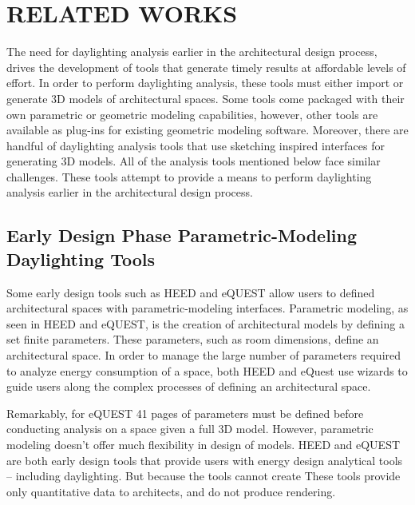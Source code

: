 \chapter{RELATED WORKS} \label{sec:introduction}
The need for daylighting analysis earlier in the architectural design process, drives the development of tools that generate timely results at affordable levels of effort.
In order to perform daylighting analysis, these tools must either import or generate 3D models of architectural spaces.
Some tools come packaged with their own parametric or geometric modeling capabilities, however, other tools are available as plug-ins for existing geometric modeling software.
Moreover, there are handful of daylighting analysis tools that use sketching inspired interfaces for generating 3D models.
All of the analysis tools mentioned below face similar challenges.
These tools attempt to provide a means to perform daylighting analysis earlier in the architectural design process.

\section{Early Design Phase Parametric-Modeling Daylighting Tools}

	Some early design tools such as HEED and eQUEST allow users to defined architectural spaces with parametric-modeling interfaces. 
	Parametric modeling, as seen in HEED and eQUEST, is the creation of architectural models by defining a set finite parameters.
	These parameters, such as room dimensions, define an architectural space.
	In order to manage the large number of parameters required to analyze energy consumption of a space, both HEED and eQuest use wizards to guide users along the complex processes of defining an architectural space.


	
	Remarkably, for eQUEST 41 pages of parameters must be defined before conducting analysis on a space given a full 3D model.
	However, parametric modeling doesn't offer much flexibility in design of models.
	HEED and eQUEST are both early design tools that provide users with energy design analytical tools -- including daylighting.
	But because the tools cannot create 
	These tools provide only quantitative data to architects, and do not produce rendering.




